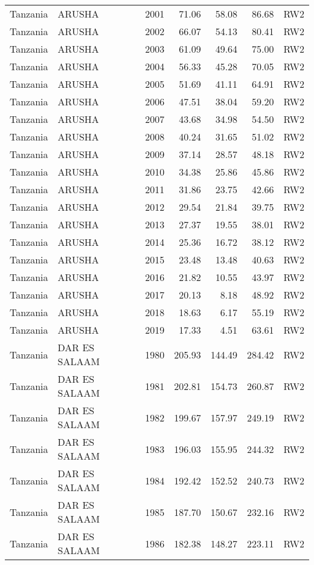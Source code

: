 \begin{longtable}{lllrrrl}
  Tanzania & ARUSHA & 2001 & 71.06 & 58.08 & 86.68 & RW2 \\ 
  Tanzania & ARUSHA & 2002 & 66.07 & 54.13 & 80.41 & RW2 \\ 
  Tanzania & ARUSHA & 2003 & 61.09 & 49.64 & 75.00 & RW2 \\ 
  Tanzania & ARUSHA & 2004 & 56.33 & 45.28 & 70.05 & RW2 \\ 
  Tanzania & ARUSHA & 2005 & 51.69 & 41.11 & 64.91 & RW2 \\ 
  Tanzania & ARUSHA & 2006 & 47.51 & 38.04 & 59.20 & RW2 \\ 
  Tanzania & ARUSHA & 2007 & 43.68 & 34.98 & 54.50 & RW2 \\ 
  Tanzania & ARUSHA & 2008 & 40.24 & 31.65 & 51.02 & RW2 \\ 
  Tanzania & ARUSHA & 2009 & 37.14 & 28.57 & 48.18 & RW2 \\ 
  Tanzania & ARUSHA & 2010 & 34.38 & 25.86 & 45.86 & RW2 \\ 
  Tanzania & ARUSHA & 2011 & 31.86 & 23.75 & 42.66 & RW2 \\ 
  Tanzania & ARUSHA & 2012 & 29.54 & 21.84 & 39.75 & RW2 \\ 
  Tanzania & ARUSHA & 2013 & 27.37 & 19.55 & 38.01 & RW2 \\ 
  Tanzania & ARUSHA & 2014 & 25.36 & 16.72 & 38.12 & RW2 \\ 
  Tanzania & ARUSHA & 2015 & 23.48 & 13.48 & 40.63 & RW2 \\ 
  Tanzania & ARUSHA & 2016 & 21.82 & 10.55 & 43.97 & RW2 \\ 
  Tanzania & ARUSHA & 2017 & 20.13 & 8.18 & 48.92 & RW2 \\ 
  Tanzania & ARUSHA & 2018 & 18.63 & 6.17 & 55.19 & RW2 \\ 
  Tanzania & ARUSHA & 2019 & 17.33 & 4.51 & 63.61 & RW2 \\ 
  Tanzania & DAR ES SALAAM & 1980 & 205.93 & 144.49 & 284.42 & RW2 \\ 
  Tanzania & DAR ES SALAAM & 1981 & 202.81 & 154.73 & 260.87 & RW2 \\ 
  Tanzania & DAR ES SALAAM & 1982 & 199.67 & 157.97 & 249.19 & RW2 \\ 
  Tanzania & DAR ES SALAAM & 1983 & 196.03 & 155.95 & 244.32 & RW2 \\ 
  Tanzania & DAR ES SALAAM & 1984 & 192.42 & 152.52 & 240.73 & RW2 \\ 
  Tanzania & DAR ES SALAAM & 1985 & 187.70 & 150.67 & 232.16 & RW2 \\ 
  Tanzania & DAR ES SALAAM & 1986 & 182.38 & 148.27 & 223.11 & RW2 \\ 

\end{longtable}

